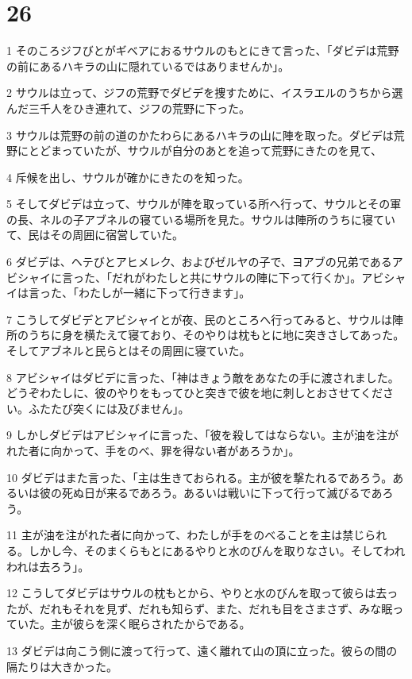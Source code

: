 \chapter{26}

\par 1 そのころジフびとがギベアにおるサウルのもとにきて言った、「ダビデは荒野の前にあるハキラの山に隠れているではありませんか」。
\par 2 サウルは立って、ジフの荒野でダビデを捜すために、イスラエルのうちから選んだ三千人をひき連れて、ジフの荒野に下った。
\par 3 サウルは荒野の前の道のかたわらにあるハキラの山に陣を取った。ダビデは荒野にとどまっていたが、サウルが自分のあとを追って荒野にきたのを見て、
\par 4 斥候を出し、サウルが確かにきたのを知った。
\par 5 そしてダビデは立って、サウルが陣を取っている所へ行って、サウルとその軍の長、ネルの子アブネルの寝ている場所を見た。サウルは陣所のうちに寝ていて、民はその周囲に宿営していた。
\par 6 ダビデは、ヘテびとアヒメレク、およびゼルヤの子で、ヨアブの兄弟であるアビシャイに言った、「だれがわたしと共にサウルの陣に下って行くか」。アビシャイは言った、「わたしが一緒に下って行きます」。
\par 7 こうしてダビデとアビシャイとが夜、民のところへ行ってみると、サウルは陣所のうちに身を横たえて寝ており、そのやりは枕もとに地に突きさしてあった。そしてアブネルと民らとはその周囲に寝ていた。
\par 8 アビシャイはダビデに言った、「神はきょう敵をあなたの手に渡されました。どうぞわたしに、彼のやりをもってひと突きで彼を地に刺しとおさせてください。ふたたび突くには及びません」。
\par 9 しかしダビデはアビシャイに言った、「彼を殺してはならない。主が油を注がれた者に向かって、手をのべ、罪を得ない者があろうか」。
\par 10 ダビデはまた言った、「主は生きておられる。主が彼を撃たれるであろう。あるいは彼の死ぬ日が来るであろう。あるいは戦いに下って行って滅びるであろう。
\par 11 主が油を注がれた者に向かって、わたしが手をのべることを主は禁じられる。しかし今、そのまくらもとにあるやりと水のびんを取りなさい。そしてわれわれは去ろう」。
\par 12 こうしてダビデはサウルの枕もとから、やりと水のびんを取って彼らは去ったが、だれもそれを見ず、だれも知らず、また、だれも目をさまさず、みな眠っていた。主が彼らを深く眠らされたからである。
\par 13 ダビデは向こう側に渡って行って、遠く離れて山の頂に立った。彼らの間の隔たりは大きかった。
